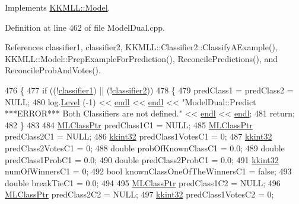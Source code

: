 Implements \hyperlink{class_k_k_m_l_l_1_1_model_a631de950cab4c8cbcbc1bbdb252964d7}{K\+K\+M\+L\+L\+::\+Model}.



Definition at line 462 of file Model\+Dual.\+cpp.



References classifier1, classifier2, K\+K\+M\+L\+L\+::\+Classifier2\+::\+Classify\+A\+Example(), K\+K\+M\+L\+L\+::\+Model\+::\+Prep\+Example\+For\+Prediction(), Reconcile\+Predictions(), and Reconcile\+Prob\+And\+Votes().


\begin{DoxyCode}
476 \{
477   \textcolor{keywordflow}{if}  ((!\hyperlink{class_k_k_m_l_l_1_1_model_dual_a702b5e302cc05ab6cdc3ee4ae8115622}{classifier1})  ||  (!\hyperlink{class_k_k_m_l_l_1_1_model_dual_a18ed538fadc0cb3eebdb9175ccce22e2}{classifier2}))
478   \{
479     predClass1 = predClass2 = NULL;
480     log.\hyperlink{class_k_k_b_1_1_run_log_a32cf761d7f2e747465fd80533fdbb659}{Level} (-1) << \hyperlink{namespace_k_k_b_ad1f50f65af6adc8fa9e6f62d007818a8}{endl} << \hyperlink{namespace_k_k_b_ad1f50f65af6adc8fa9e6f62d007818a8}{endl} << \textcolor{stringliteral}{"ModelDual::Predict   ***ERROR***      Both Classifiers
       are not defined."} << \hyperlink{namespace_k_k_b_ad1f50f65af6adc8fa9e6f62d007818a8}{endl} << \hyperlink{namespace_k_k_b_ad1f50f65af6adc8fa9e6f62d007818a8}{endl};
481     \textcolor{keywordflow}{return};
482   \}
483 
484   \hyperlink{class_k_k_m_l_l_1_1_m_l_class}{MLClassPtr}       predClass1C1       = NULL;
485   \hyperlink{class_k_k_m_l_l_1_1_m_l_class}{MLClassPtr}       predClass2C1       = NULL;
486   \hyperlink{namespace_k_k_b_a8fa4952cc84fda1de4bec1fbdd8d5b1b}{kkint32}          predClass1VotesC1  = 0;
487   \hyperlink{namespace_k_k_b_a8fa4952cc84fda1de4bec1fbdd8d5b1b}{kkint32}          predClass2VotesC1  = 0;
488   \textcolor{keywordtype}{double}           probOfKnownClassC1 = 0.0;
489   \textcolor{keywordtype}{double}           predClass1ProbC1   = 0.0;
490   \textcolor{keywordtype}{double}           predClass2ProbC1   = 0.0;
491   \hyperlink{namespace_k_k_b_a8fa4952cc84fda1de4bec1fbdd8d5b1b}{kkint32}          numOfWinnersC1     = 0;
492   \textcolor{keywordtype}{bool}             knownClassOneOfTheWinnersC1 = \textcolor{keyword}{false};
493   \textcolor{keywordtype}{double}           breakTieC1         = 0.0;
494 
495   \hyperlink{class_k_k_m_l_l_1_1_m_l_class}{MLClassPtr}       predClass1C2       = NULL;
496   \hyperlink{class_k_k_m_l_l_1_1_m_l_class}{MLClassPtr}       predClass2C2       = NULL;
497   \hyperlink{namespace_k_k_b_a8fa4952cc84fda1de4bec1fbdd8d5b1b}{kkint32}          predClass1VotesC2  = 0;

\end{DoxyCode}
